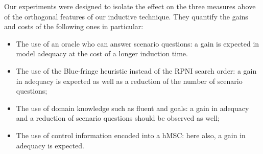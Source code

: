 Our experiments were designed to isolate the effect on the three measures above of the orthogonal features of our inductive technique. They quantify the gains and costs of the following ones in particular:
\begin{itemize}
\item The use of an oracle who can answer scenario questions: a gain is expected in model adequacy at the cost of a longer induction time.
\item The use of the Blue-fringe heuristic instead of the RPNI search order: a gain in adequacy is expected as well as a reduction of the number of scenario questions;
\item The use of domain knowledge such as fluent and goals: a gain in adequacy and a reduction of scenario questions should be observed as well;
\item The use of control information encoded into a hMSC: here also, a gain in adequacy is expected.
\end{itemize}

